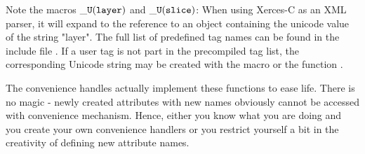 \documentclass[10pt,a4paper]{article}
\begin{document}
\noindent
Note the macros $\tt{\_U(layer)}$ and $\tt{\_U(slice)}$: 
When using Xerces-C as an XML parser, 
it will expand to the reference to an object containing the unicode value 
of the string "layer". The full list of predefined tag names can be found in the
include file .
If a user tag is not part in the precompiled tag list, the corresponding Unicode
string may be created with the macro  or the function
.

\noindent
The convenience handles actually implement
these functions to ease life. There is no magic - newly created attributes
with new names obviously cannot be accessed with convenience mechanism.
Hence, either you know what you are doing and you create your own 
convenience handlers or you restrict yourself a bit in the creativity
of defining new attribute names.
\end{document}
